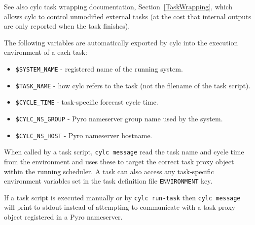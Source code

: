 
See also cylc task wrapping documentation, Section~\ref{TaskWrapping},
which allows cylc to control unmodified external tasks (at the cost that
internal outputs are only reported when the task finishes).

\lstset{language=bash}

The following variables are automatically exported by cylc into
the execution environment of a each task:
\begin{itemize}
   \item \lstinline=$SYSTEM_NAME= - registered name of the running system.
   \item \lstinline=$TASK_NAME= - how cylc refers to the task (not the
       filename of the task script). 
   \item \lstinline=$CYCLE_TIME= - task-specific forecast cycle time.
   \item \lstinline=$CYLC_NS_GROUP= - Pyro nameserver group name used by the system.
   \item \lstinline=$CYLC_NS_HOST= - Pyro nameserver hostname.
\end{itemize}

\lstset{language=bash}
When called by a task script, \lstinline=cylc message= read the task
name and cycle time from the environment and uses these to target the
correct task proxy object within the running scheduler.
\lstset{language=cylctaskdef=}
A task can also access any task-specific
environment variables set in the task definition file
\lstinline=ENVIRONMENT= key.

\lstset{language=bash}

If a task script is executed manually or by \lstinline=cylc run-task=
then \lstinline=cylc message= will print to stdout instead of attempting
to communicate with a task proxy object registered in a Pyro nameserver.
